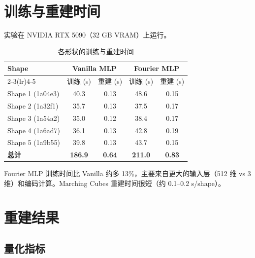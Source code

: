 \documentclass[12pt, a4paper]{article}
\begin{document}
\section{训练与重建时间}

实验在 NVIDIA RTX 5090（32 GB VRAM）上运行。

\begin{table}[H]
  \centering
  \caption{各形状的训练与重建时间}
  \begin{tabular}{lcccc}
    \toprule
    Shape & \multicolumn{2}{c}{Vanilla MLP} & \multicolumn{2}{c}{Fourier MLP} \\
    \cmidrule(lr){2-3}\cmidrule(lr){4-5}
          & 训练 (s) & 重建 (s) & 训练 (s) & 重建 (s) \\
    \midrule
    Shape 1 (1a04e3) & 40.3 & 0.13 & 48.6 & 0.15 \\
    Shape 2 (1a32f1) & 35.7 & 0.13 & 37.5 & 0.17 \\
    Shape 3 (1a54a2) & 35.0 & 0.12 & 38.4 & 0.17 \\
    Shape 4 (1a6ad7) & 36.1 & 0.13 & 42.8 & 0.19 \\
    Shape 5 (1a9b55) & 39.8 & 0.13 & 43.7 & 0.15 \\
    \midrule
    \textbf{总计} & \textbf{186.9} & \textbf{0.64} & \textbf{211.0} & \textbf{0.83} \\
    \bottomrule
  \end{tabular}
\end{table}

Fourier MLP 训练时间比 Vanilla 约多 13\%，主要来自更大的输入层（512 维 vs 3 维）和编码计算。Marching Cubes 重建时间很短（约 0.1--0.2 s/shape）。

\section{重建结果}

\subsection{量化指标}
\end{document}
